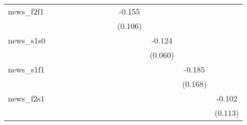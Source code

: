 {\begin{tabular}{l*{12}{c}}
\addlinespace
news\_f2f1   &                     &                     &                     &                     &                     &                     &                     &                     &      -0.155         &                     &                     &                     \\
            &                     &                     &                     &                     &                     &                     &                     &                     &     (0.106)         &                     &                     &                     \\
\addlinespace
news\_s1s0   &                     &                     &                     &                     &                     &                     &                     &                     &                     &      -0.124\sym{**} &                     &                     \\
            &                     &                     &                     &                     &                     &                     &                     &                     &                     &     (0.060)         &                     &                     \\
\addlinespace
news\_s1f1   &                     &                     &                     &                     &                     &                     &                     &                     &                     &                     &      -0.185         &                     \\
            &                     &                     &                     &                     &                     &                     &                     &                     &                     &                     &     (0.168)         &                     \\
\addlinespace
news\_f2s1   &                     &                     &                     &                     &                     &                     &                     &                     &                     &                     &                     &      -0.102         \\
            &                     &                     &                     &                     &                     &                     &                     &                     &                     &                     &                     &     (0.113)         \\

\end{tabular}}
